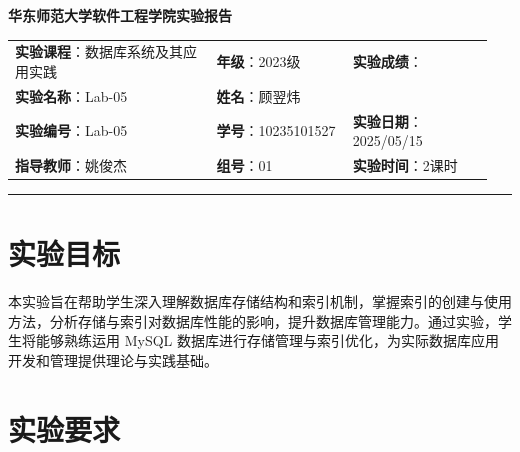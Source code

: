 \documentclass{article}
\begin{document}
	\begin{center}
		{\Large{\textbf{\heiti 华东师范大学软件工程学院实验报告}}}
		\begin{table}[htb]
			\flushleft
			\begin{tabular}{p{0.4\linewidth}p{0.27\linewidth}p{0.28\linewidth}}\\
				\textbf{实验课程}：数据库系统及其应用实践  & \textbf{年级}：2023级       & \textbf{实验成绩}：  \\
				\textbf{实验名称}：Lab-05 & \textbf{姓名}：顾翌炜         &                 \\
				\textbf{实验编号}：Lab-05     & \textbf{学号}：10235101527 & \textbf{实验日期}：2025/05/15  \\
				\textbf{指导教师}：姚俊杰     & \textbf{组号}：01            & \textbf{实验时间}：2课时  \\ 
			\end{tabular}
		\end{table}
	\end{center}
	\rule{\textwidth}{2pt}
	
	\tableofcontents
	
	\vspace{1cm}
	
	\section{实验目标}
	
	本实验旨在帮助学生深入理解数据库存储结构和索引机制，掌握索引的创建与使用方法，分析存储与索引对数据库性能的影响，提升数据库管理能力。通过实验，学生将能够熟练运用 MySQL 数据库进行存储管理与索引优化，为实际数据库应用开发和管理提供理论与实践基础。
	
	\section{实验要求}
	
\end{document}
